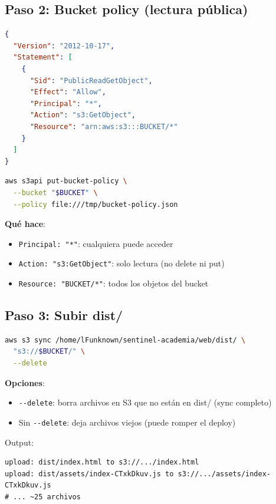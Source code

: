 \documentclass[11pt,a4paper,oneside]{article}
\begin{document}
\subsection{Paso 2: Bucket policy (lectura p\'ublica)}

\begin{lstlisting}[language=json,caption={/tmp/bucket-policy.json}]
{
  "Version": "2012-10-17",
  "Statement": [
    {
      "Sid": "PublicReadGetObject",
      "Effect": "Allow",
      "Principal": "*",
      "Action": "s3:GetObject",
      "Resource": "arn:aws:s3:::BUCKET/*"
    }
  ]
}
\end{lstlisting}

\begin{lstlisting}[language=bash]
aws s3api put-bucket-policy \
  --bucket "$BUCKET" \
  --policy file:///tmp/bucket-policy.json
\end{lstlisting}

\textbf{Qu\'e hace}:
\begin{itemize}
  \item \texttt{Principal: "*"}: cualquiera puede acceder
  \item \texttt{Action: "s3:GetObject"}: solo lectura (no delete ni put)
  \item \texttt{Resource: "BUCKET/*"}: todos los objetos del bucket
\end{itemize}

\subsection{Paso 3: Subir dist/}

\begin{lstlisting}[language=bash]
aws s3 sync /home/lFunknown/sentinel-academia/web/dist/ \
  "s3://$BUCKET/" \
  --delete
\end{lstlisting}

\textbf{Opciones}:
\begin{itemize}
  \item \texttt{-{}-delete}: borra archivos en S3 que no est\'an en dist/ (sync completo)
  \item Sin \texttt{-{}-delete}: deja archivos viejos (puede romper el deploy)
\end{itemize}

Output:
\begin{lstlisting}
upload: dist/index.html to s3://.../index.html
upload: dist/assets/index-CTxkDkuv.js to s3://.../assets/index-CTxkDkuv.js
# ... ~25 archivos
\end{lstlisting}
\end{document}
